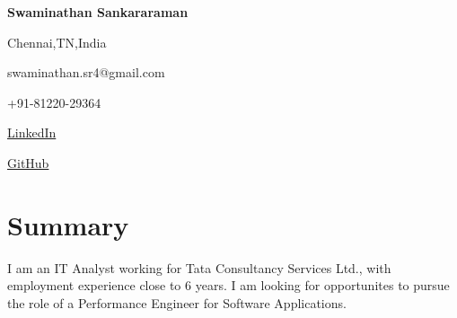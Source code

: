 \documentclass{article}
\begin{document}
	
	\begin{center}
	\begin{Huge}
	\textbf{Swaminathan Sankararaman}
	\end{Huge}
	\end{center}
	
	
	\vspace{-\baselineskip}\hspace{-1.5em}\hrulefill\vspace{-.7\baselineskip}

	\begin{center}
		\begin{inparaitem}[\hspace{1em}\textbullet]
			\hspace{-1em}\item Chennai,TN,India
			\item swaminathan.sr4@gmail.com
			\item +91-81220-29364
			\item \href{https://www.linkedin.com/in/swaminathan-sankara-raman-79004198/}{LinkedIn}
			\item \href{https://github.com/swami1894}{GitHub}
		\end{inparaitem}
	\end{center}
	
	\section*{Summary \hrulefill\vspace{-.3\baselineskip}}
	\hspace{3em}I am an IT Analyst working for Tata Consultancy Services Ltd., with employment experience close to 6 years. I am looking for opportunites to pursue the role of a Performance Engineer for Software Applications.
	
\end{document}
